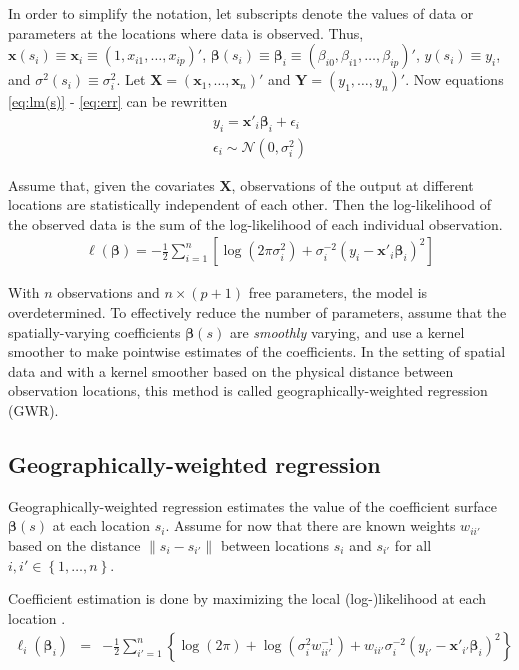 \documentclass[authoryear, review, 11pt]{elsarticle}
\begin{document}
	In order to simplify the notation, let subscripts denote the values of data or parameters at the locations where data is observed. Thus, $\bm{x}(s_i) \equiv \bm{x}_i \equiv \left( 1, x_{i1}, \dots, x_{ip} \right)'$, $\bm{\beta}(s_i) \equiv \bm{\beta}_i \equiv \left(\beta_{i0}, \beta_{i1}, \dots, \beta_{ip} \right)'$, $y(s_i) \equiv y_i$, and $\sigma^2(s_i) \equiv \sigma^2_i$. Let $\bm{X} = \left( \bm{x}_1, \dots, \bm{x}_n \right)'$ and $\bm{Y} = \left( y_1, \dots, y_n \right)'$. Now equations \ref{eq:lm(s)} - \ref{eq:err} can be rewritten
	\begin{eqnarray}
		y_i = \bm{x}'_i \bm{\beta}_i + \epsilon_i\\
		\epsilon_i \sim \mathcal{N} \left( 0,\sigma_i^2 \right)
	\end{eqnarray}
	
	Assume that, given the covariates $\bm{X}$, observations of the output at different locations are statistically independent of each other. Then the log-likelihood of the observed data is the sum of the log-likelihood of each individual observation.
	 \begin{eqnarray}
	 	\ell\left( \bm{\beta} \right) = - \frac{1}{2} \sum_{i=1}^n \left[  \log \left( 2 \pi \sigma^2_i\right) +  \sigma^{-2}_i  \left(y_i - \bm{x}'_i\bm{\beta}_i \right)^2  \right]
	\end{eqnarray}
	
	With $n$ observations and $n \times (p+1)$ free parameters, the model is overdetermined. To effectively reduce the number of parameters, assume that the spatially-varying coefficients $\bm{\beta}(s)$ are \emph{smoothly} varying, and use a kernel smoother to make pointwise estimates of the coefficients. In the setting of spatial data and with a kernel smoother based on the physical distance between observation locations, this method is called geographically-weighted regression (GWR).
		
	\subsection{Geographically-weighted regression}
	Geographically-weighted regression estimates the value of the coefficient surface $\bm{\beta}(s)$ at each location $s_i$. Assume for now that there are known weights $w_{ii'}$ based on the distance $\|s_i  -s_{i'}\|$ between locations $s_i$ and $s_{i'}$ for all $i, i' \in \left\{1, \dots, n\right\}$.
	
	Coefficient estimation is done by maximizing the local (log-)likelihood at each location \citep{Fotheringham:2002}.	
	\begin{eqnarray}
		\ell_i\left(\bm{\beta}_i\right) &=& - \frac{1}{2} \sum_{i'=1}^n \left\{ \log{\left(2 \pi\right)}  + \log{\left(\sigma^2_i w^{-1}_{ii'} \right)}  +  w_{ii'} \sigma^{-2}_i  \left(y_{i'} - \bm{x}'_{i'} \bm{\beta}_i \right)^2 \right\}
	\end{eqnarray}
	
\end{document}
